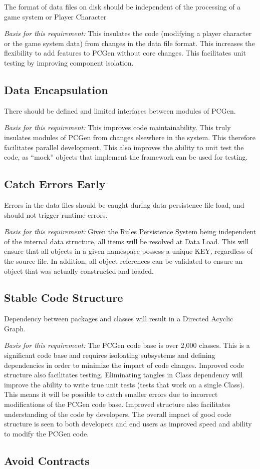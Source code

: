 \documentclass[12pt,letterpaper]{article}
\newcommand{\systemEOS}{Rules Persistence System}
\newcommand{\system}{\systemEOS{} }
\newcommand{\textem}[1]{\emph{#1}}
\newcommand{\lsubsection}[1]{\label{#1}\subsection{#1}}
\newcommand{\basis}{\noindent\textem{Basis for this requirement:} }
\begin{document}
The format of data files on disk should be independent of the processing of a game system or
Player Character

\basis This insulates the code (modifying a player character or the game system data)
from changes in the data file format.  This increases the flexibility to add features to
PCGen without core changes.  This facilitates unit testing by improving component isolation.

\lsubsection{Data Encapsulation}

There should be defined and limited interfaces between modules of PCGen.

\basis This improves code maintainability.  This truly insulates modules of PCGen from
changes elsewhere in the system.  This therefore facilitates parallel development.  This
also improves the ability to unit test the code, as ``mock'' objects that implement the
framework can be used for testing.

\lsubsection{Catch Errors Early}

Errors in the data files should be caught during data persistence file load, and should not
trigger runtime errors.
 
\basis Given the \system being independent of the internal data structure,
all items will be resolved at Data Load.  This will ensure that all objects
in a given namespace possess a unique KEY, regardless of the source file.  In addition,
all object references can be validated to ensure an object that was actually
constructed and loaded.

\lsubsection{Stable Code Structure}

Dependency between packages and classes will result in a Directed Acyclic Graph.

\basis The PCGen code base is over 2,000 classes.  This is a significant code base and
requires isoloating subsystems and defining dependencies in order to minimize the impact
of code changes.  Improved code structure also facilitates testing.  Eliminating tangles
in Class dependency will improve the ability to write true unit tests (tests that work on a
single Class).  This means it will be possible to catch smaller errors due to incorrect
modifications of the PCGen code base.  Improved structure also facilitates understanding
of the code by developers.  The overall impact of good code structure is seen to both
developers and end users as improved speed and ability to modify the PCGen code.

\lsubsection{Avoid Contracts}
\end{document}
